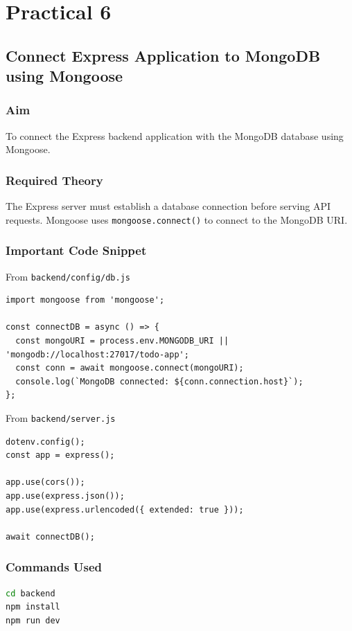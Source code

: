 \documentclass[12pt,a4paper]{article}
\begin{document}
\section*{Practical 6}
\subsection*{Connect Express Application to MongoDB using Mongoose}

\subsubsection*{Aim}
To connect the Express backend application with the MongoDB database using Mongoose.

\subsubsection*{Required Theory}
The Express server must establish a database connection before serving API requests. Mongoose uses \texttt{mongoose.connect()} to connect to the MongoDB URI.

\subsubsection*{Important Code Snippet}
From \texttt{backend/config/db.js}
\begin{lstlisting}[style=projectcode]
import mongoose from 'mongoose';

const connectDB = async () => {
  const mongoURI = process.env.MONGODB_URI || 'mongodb://localhost:27017/todo-app';
  const conn = await mongoose.connect(mongoURI);
  console.log(`MongoDB connected: ${conn.connection.host}`);
};
\end{lstlisting}

From \texttt{backend/server.js}
\begin{lstlisting}[style=projectcode]
dotenv.config();
const app = express();

app.use(cors());
app.use(express.json());
app.use(express.urlencoded({ extended: true }));

await connectDB();
\end{lstlisting}

\subsubsection*{Commands Used}
\begin{lstlisting}[style=projectcode,language=bash]
cd backend
npm install
npm run dev
\end{lstlisting}
\end{document}

